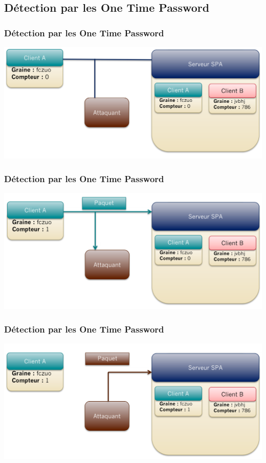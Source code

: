 \subsection{Détection par les One Time Password}

\begin{frame}[fragile]
\frametitle{Détection par les One Time Password}
\centerline{\includegraphics[scale=0.35]{OTP}}
\end{frame}

\begin{frame}[fragile]
\frametitle{Détection par les One Time Password}
\centerline{\includegraphics[scale=0.35]{OTP1}}
\end{frame}

\begin{frame}[fragile]
\frametitle{Détection par les One Time Password}
\centerline{\includegraphics[scale=0.35]{OTP2}}
\end{frame}


